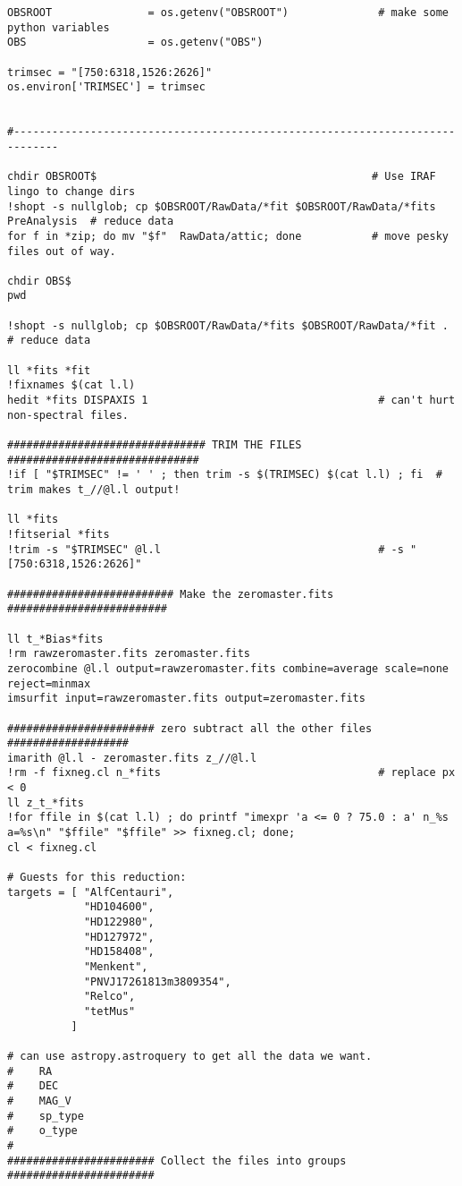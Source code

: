 \begin{verbatim}
OBSROOT               = os.getenv("OBSROOT")              # make some python variables
OBS                   = os.getenv("OBS")

trimsec = "[750:6318,1526:2626]"
os.environ['TRIMSEC'] = trimsec


#-----------------------------------------------------------------------------

chdir OBSROOT$                                           # Use IRAF lingo to change dirs
!shopt -s nullglob; cp $OBSROOT/RawData/*fit $OBSROOT/RawData/*fits   PreAnalysis  # reduce data
for f in *zip; do mv "$f"  RawData/attic; done           # move pesky files out of way.

chdir OBS$
pwd

!shopt -s nullglob; cp $OBSROOT/RawData/*fits $OBSROOT/RawData/*fit .  # reduce data

ll *fits *fit
!fixnames $(cat l.l)
hedit *fits DISPAXIS 1                                    # can't hurt non-spectral files.

############################### TRIM THE FILES ##############################
!if [ "$TRIMSEC" != ' ' ; then trim -s $(TRIMSEC) $(cat l.l) ; fi  # trim makes t_//@l.l output!

ll *fits
!fitserial *fits
!trim -s "$TRIMSEC" @l.l                                  # -s "[750:6318,1526:2626]"

########################## Make the zeromaster.fits #########################

ll t_*Bias*fits
!rm rawzeromaster.fits zeromaster.fits
zerocombine @l.l output=rawzeromaster.fits combine=average scale=none reject=minmax
imsurfit input=rawzeromaster.fits output=zeromaster.fits

####################### zero subtract all the other files ###################
imarith @l.l - zeromaster.fits z_//@l.l
!rm -f fixneg.cl n_*fits                                  # replace px < 0
ll z_t_*fits
!for ffile in $(cat l.l) ; do printf "imexpr 'a <= 0 ? 75.0 : a' n_%s  a=%s\n" "$ffile" "$ffile" >> fixneg.cl; done;
cl < fixneg.cl

# Guests for this reduction:
targets = [ "AlfCentauri",
            "HD104600",
            "HD122980",
            "HD127972",
            "HD158408",
            "Menkent",
            "PNVJ17261813m3809354",
            "Relco",
            "tetMus"
          ]

# can use astropy.astroquery to get all the data we want.
#    RA
#    DEC
#    MAG_V
#    sp_type
#    o_type
# 
####################### Collect the files into groups #######################


\end{verbatim}
